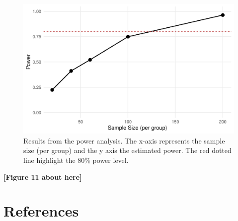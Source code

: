 \documentclass[
  man,floatsintext]{apa6}
\begin{document}
\normalsize

\scriptsize

\begin{figure}

{\centering \includegraphics[width=1\linewidth]{paper_files/figure-latex/fig-power-curve-1} 

}

\caption{Results from the power analysis. The x-axis represents the sample size (per group) and the y axis the estimated power. The red dotted line highlight the 80\% power level.}\label{fig:fig-power-curve}
\end{figure}

\begin{center}\textbf{[Figure 11 about here]} \end{center}

\normalsize

\newpage

\section{References}\label{references}
\end{document}
